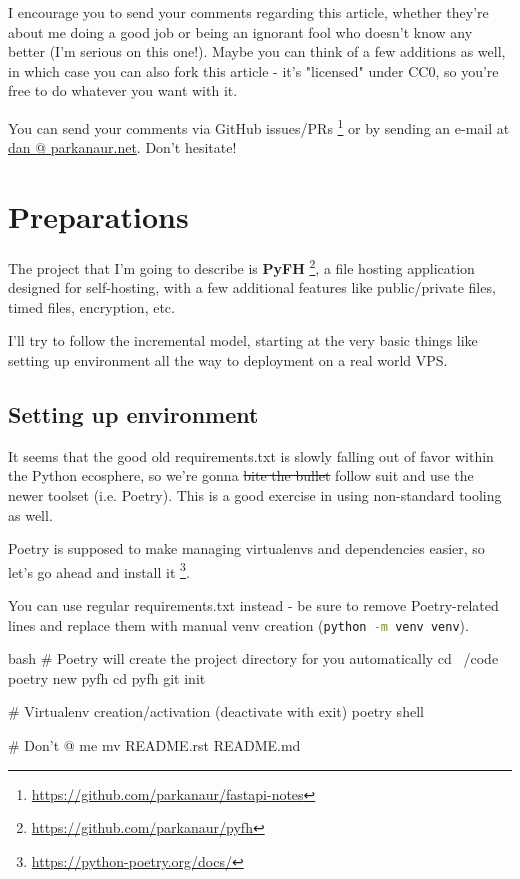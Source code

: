 \documentclass[14pt]{extarticle}
\newcommand{\flink}[1]{\footnote{\href{#1}{#1}}}
\newcommand{\cinline}[2]{{\lstinline[language=#1, style=cstyle, basicstyle=\ttfamily\normalsize]{#2}}}
\begin{document}
I encourage you to send your comments regarding this article, whether they're about me doing a good job or being an ignorant fool who doesn't know any better (I'm serious on this one!). Maybe you can think of a few additions as well, in which case you can also fork this article - it's "licensed" under CC0, so you're free to do whatever you want with it.

You can send your comments via GitHub issues/PRs \flink{https://github.com/parkanaur/fastapi-notes} or by sending an e-mail at {\href{mailto:dan@parkanaur.net}{dan @ parkanaur.net}}. Don't hesitate!

\section{Preparations}

The project that I'm going to describe is \textbf{PyFH} \flink{https://github.com/parkanaur/pyfh}, a file hosting application designed for self-hosting, with a few additional features like public/private files, timed files, encryption, etc.

I'll try to follow the incremental model, starting at the very basic things like setting up environment all the way to deployment on a real world VPS.

\subsection{Setting up environment}

It seems that the good old requirements.txt is slowly falling out of favor within the Python ecosphere, so we're gonna \sout{bite the bullet} follow suit and use the newer toolset (i.e. Poetry). This is a good exercise in using non-standard tooling as well.

Poetry is supposed to make managing virtualenvs and dependencies easier, so let's go ahead and install it \flink{https://python-poetry.org/docs/}.

You can use regular requirements.txt instead - be sure to remove Poetry-related lines and replace them with manual venv creation (\cinline{bash}{python -m venv venv}).

\begin{code}{bash}
    # Poetry will create the project directory for you automatically
    cd ~/code
    poetry new pyfh
    cd pyfh
    git init

    # Virtualenv creation/activation (deactivate with exit)
    poetry shell

    # Don't @ me
    mv README.rst README.md
\end{code}
\end{document}
